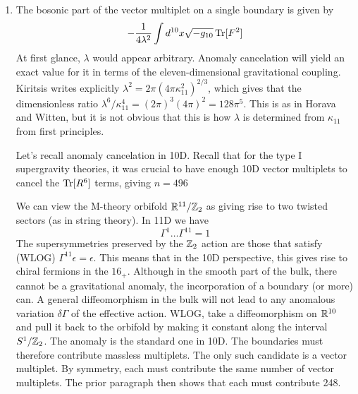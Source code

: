 \documentclass[11pt, class=article, crop=false]{standalone}
\begin{document}
\begin{enumerate}
	\item 
	The bosonic part of the vector multiplet on a single boundary is given by
	\[
		-\frac{1}{4 \lambda^2} \int d^{10} x \sqrt{-g_{10}} \,\mathrm{Tr}[F^2]
	\]
	At first glance, $\lambda$ would appear arbitrary. Anomaly cancelation will yield an exact value for it in terms of the eleven-dimensional gravitational coupling. Kiritsis writes explicitly $\lambda^2 = 2 \pi (4 \pi \kappa_{11}^2)^{2/3}$, which gives that the dimensionless ratio $\lambda^6/\kappa_{11}^4 = (2 \pi)^3 (4 \pi)^2 = 128 \pi^5$. This is as in Horava and Witten, but it is not obvious that this is how $\lambda$ is determined from $\kappa_{11}$ from first principles. 
	
	Let's recall anomaly cancelation in 10D. Recall that for the type I supergravity theories, it was crucial to have enough 10D vector multiplets to cancel the $\mathrm{Tr}[R^6]$ terms, giving $n=496$
	
	We can view the M-theory orbifold $\mathbb{R}^{11}/\mathbb{Z}_2$ as giving rise to two twisted sectors (as in string theory). In 11D we have
	\[
		\Gamma^1 \dots \Gamma^{11} = 1
	\]
	 The supersymmetries preserved by the $\mathbb{Z}_2$ action are those that satisfy (WLOG) $\Gamma^{11} \epsilon = \epsilon$. This means that in the 10D perspective, this gives rise to chiral fermions in the $16_+$. Although in the smooth part of the bulk, there cannot be a gravitational anomaly, the incorporation of a boundary (or more) can. A general diffeomorphism in the bulk will not lead to any anomalous variation $\delta \Gamma$ of the effective action. WLOG, take a diffeomorphism on $\mathbb{R}^{10}$ and pull it back to the orbifold by making it constant along the interval $S^1/\mathbb{Z}_2$. The anomaly is the standard one in 10D. The boundaries must therefore contribute massless multiplets. The only such candidate is a vector multiplet. By symmetry, each must contribute the same number of vector multiplets. The prior paragraph then shows that each must contribute 248.  
	 

\end{enumerate}
\end{document}

